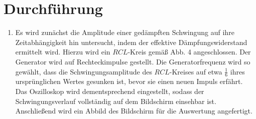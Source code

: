 \section{Durchführung}
\label{sec:Durchführung}
\renewcommand{\labelenumi}{\alph{enumi})}
\begin{enumerate}
\item Es wird zunächst die Amplitude einer gedämpften Schwingung auf ihre Zeitabhängigkeit hin untersucht, indem
 der effektive Dämpfungswiderstand ermittelt wird. Hierzu wird ein $RCL$-Kreis gemäß
 Abb. 4  angeschlossen. Der Generator wird auf Rechteckimpulse gestellt.
  Die Generatorfrequenz wird so gewählt, dass die Schwingungsamplitude des $RCL$-Kreises auf etwa $\frac{1}{6}$
   ihres ursprünglichen Wertes gesunken ist, bevor sie einen neuen Impuls erfährt. Das Oszilloskop
    wird dementsprechend eingestellt, sodass der Schwingungsverlauf vollständig auf dem Bildschirm einsehbar ist.
    Anschließend wird ein Abbild des Bildschirm für die Auswertung angefertigt.


\end{enumerate}
